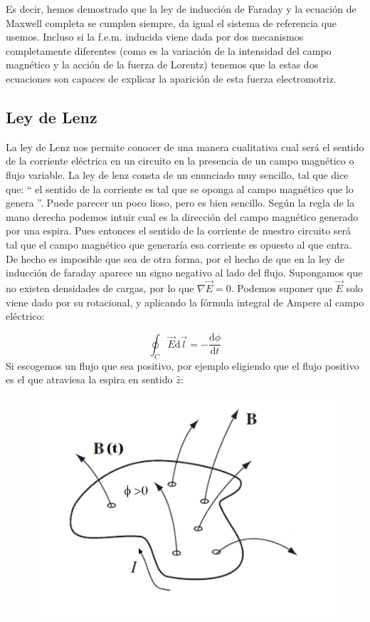\documentclass[12pt,a4paper]{article}
\newcommand{\D}{\mathrm{d}}
\begin{document}
Es decir, hemos demostrado que la ley de inducción de Faraday y la ecuación de Maxwell completa se cumplen siempre, da igual el sistema de referencia que usemos. Incluso si la f.e.m. inducida viene dada por dos mecanismos completamente diferentes (como es la variación de la intensidad del campo magnético y la acción de la fuerza de Lorentz) tenemos que la estas dos ecuaciones son capaces de explicar la aparición de esta fuerza electromotriz. \\

\subsection{Ley de Lenz}

La ley de Lenz nos permite conocer de una manera cualitativa cual será el sentido de la corriente eléctrica en un circuito en la presencia de un campo magnético o flujo variable. La ley de lenz consta de un enunciado muy sencillo, tal que dice que: `` el sentido de la corriente es tal que se oponga al campo magnético que lo genera ''. Puede parecer un poco lioso, pero es bien sencillo. Según la regla de la mano derecha podemos intuir cual es la dirección del campo magnético generado por una espira. Pues entonces el sentido de la corriente de nuestro circuito será tal que el campo magnético que generaría esa corriente es opuesto al que entra. \\

De hecho es imposible que sea de otra forma, por el hecho de que en la ley de inducción de faraday aparece un signo negativo al lado del flujo. Supongamos que no existen densidades de cargas, por lo que $\nabla \vec{E} = 0$. Podemos suponer que $\vec{E}$ solo viene dado por su rotacional, y aplicando la fórmula integral de Ampere al campo eléctrico:

\begin{equation}
\oint_C \vec{E} \D \vec{l} = - \dfrac{\D \phi}{\D t}
\end{equation}
Si escogemos un flujo que sea positivo, por ejemplo eligiendo que el flujo positivo es el que atraviesa la espira en sentido $\widehat{z}$:

\begin{figure}[h!] \centering
\includegraphics[scale=0.9]{espiras-lenz.png}
\end{figure}
\end{document}
